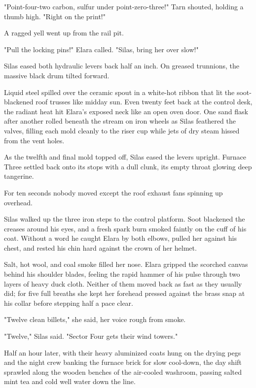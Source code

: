 "Point-four-two carbon, sulfur under point-zero-three!" Tarn shouted, holding a thumb high. "Right on the print!"

A ragged yell went up from the rail pit.

"Pull the locking pins!" Elara called. "Silas, bring her over slow!"

Silas eased both hydraulic levers back half an inch. On greased trunnions, the massive black drum tilted forward.

Liquid steel spilled over the ceramic spout in a white-hot ribbon that lit the soot-blackened roof trusses like midday sun. Even twenty feet back at the control desk, the radiant heat hit Elara's exposed neck like an open oven door. One sand flask after another rolled beneath the stream on iron wheels as Silas feathered the valves, filling each mold cleanly to the riser cup while jets of dry steam hissed from the vent holes.

As the twelfth and final mold topped off, Silas eased the levers upright. Furnace Three settled back onto its stops with a dull clunk, its empty throat glowing deep tangerine.

For ten seconds nobody moved except the roof exhaust fans spinning up overhead.

Silas walked up the three iron steps to the control platform. Soot blackened the creases around his eyes, and a fresh spark burn smoked faintly on the cuff of his coat. Without a word he caught Elara by both elbows, pulled her against his chest, and rested his chin hard against the crown of her helmet.

Salt, hot wool, and coal smoke filled her nose. Elara gripped the scorched canvas behind his shoulder blades, feeling the rapid hammer of his pulse through two layers of heavy duck cloth. Neither of them moved back as fast as they usually did; for five full breaths she kept her forehead pressed against the brass snap at his collar before stepping half a pace clear.

"Twelve clean billets," she said, her voice rough from smoke.

"Twelve," Silas said. "Sector Four gets their wind towers."

\bigskip

Half an hour later, with their heavy aluminized coats hung on the drying pegs and the night crew banking the furnace brick for slow cool-down, the day shift sprawled along the wooden benches of the air-cooled washroom, passing salted mint tea and cold well water down the line.

